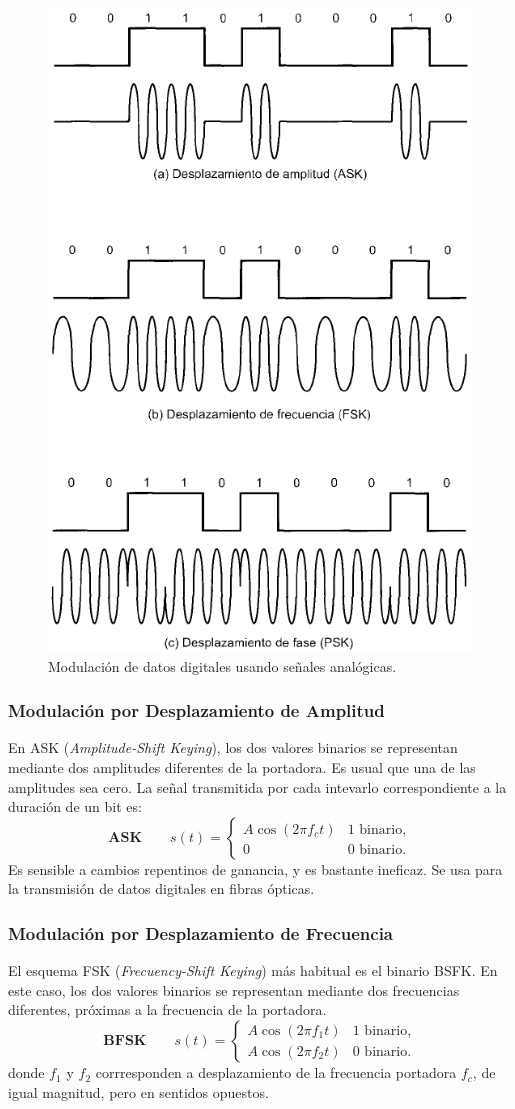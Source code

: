 \documentclass[10pt,a4paper]{article}
\begin{document}
\begin{figure}[ht!]
  \caption{Modulación de datos digitales usando señales analógicas.}
  \label{fig:dat_dig_dat_ana}  
  \centerline{
	\includegraphics[width=0.6\textwidth-\fboxrule-\fboxrule]{imgs/dat_dig_dat_ana.png}}
\end{figure}

\subsubsection{Modulación por Desplazamiento de Amplitud}
En ASK (\textit{Amplitude-Shift Keying}), los dos valores binarios se representan mediante dos amplitudes diferentes de la portadora. Es usual que una de las amplitudes sea cero. La señal transmitida por cada intevarlo correspondiente a la duración de un bit es:
\[\mathbf{ASK} \qquad
 s(t) = \begin{cases}
        A \cos(2\pi f_c t)  & \text{1 binario,}\\
        0 & \text{0 binario.}
        \end{cases}
\]
Es sensible a cambios repentinos de ganancia, y es bastante ineficaz. Se usa para la transmisión de datos digitales en fibras ópticas.

\subsubsection{Modulación por Desplazamiento de Frecuencia}
El esquema FSK (\textit{Frecuency-Shift Keying}) más habitual es el binario BSFK. En este caso, los dos valores binarios se representan mediante dos frecuencias diferentes, próximas a la frecuencia de la portadora.
\[\mathbf{BFSK} \qquad
 s(t) = \begin{cases}
        A \cos(2\pi f_1 t)  & \text{1 binario,}\\
        A \cos(2\pi f_2 t) & \text{0 binario.}
        \end{cases}
\]
donde $f_1$ y $f_2$ corrresponden a desplazamiento de la frecuencia portadora $f_c$, de igual magnitud, pero en sentidos opuestos.
\end{document}
